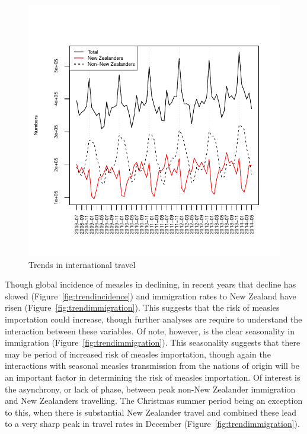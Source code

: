 \documentclass{article}
\begin{document}
\begin{figure}
     \begin{center}
     \includegraphics[width=1\textwidth]{nzers.pdf}
     \end{center}
     \caption{Trends in international travel}
     \label{fig:travel}
\end{figure}

Though global incidence of measles in declining, in recent years that decline has slowed (Figure~\ref{fig:trendincidence}) and immigration rates to New Zealand have risen (Figure~\ref{fig:trendimmigration}). This suggests that the risk of measles importation could increase, though further analyses are require to understand the interaction between these variables.  Of note, however, is the clear seasonality in immigration (Figure~\ref{fig:trendimmigration}).  This seasonality suggests that there may be period of increased risk of measles importation, though again the interactions with seasonal measles transmission from the nations of origin will be an important factor in determining the risk of measles importation. Of interest is the asynchrony, or lack of phase, between peak non-New Zealander immigration and New Zealanders travelling. The Christmas summer period being an exception to this, when there is substantial New Zealander travel and combined these lead to a very sharp peak in travel rates in December (Figure~\ref{fig:trendimmigration}).
\end{document}

